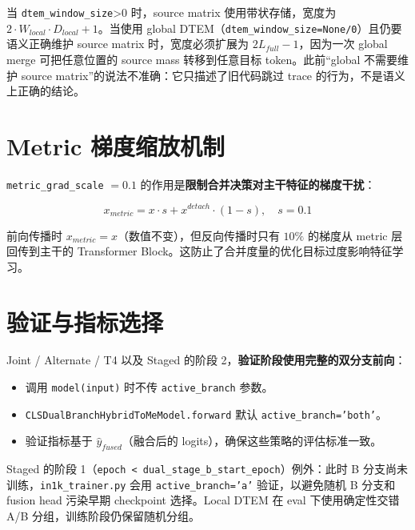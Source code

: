 \documentclass[a4paper,11pt]{article}
\begin{document}
当 \texttt{dtem\_window\_size}>0 时，source matrix 使用带状存储，宽度为 $2\cdot W_{local}\cdot D_{local}+1$。当使用 global DTEM（\texttt{dtem\_window\_size=None/0}）且仍要语义正确维护 source matrix 时，宽度必须扩展为 $2L_{full}-1$，因为一次 global merge 可把任意位置的 source mass 转移到任意目标 token。此前“global 不需要维护 source matrix”的说法不准确：它只描述了旧代码跳过 trace 的行为，不是语义上正确的结论。

\section{Metric 梯度缩放机制}

\texttt{metric\_grad\_scale} $= 0.1$ 的作用是\textbf{限制合并决策对主干特征的梯度干扰}：

\[
    x_{metric} = x \cdot s + x^{detach} \cdot (1 - s), \quad s = 0.1
\]

前向传播时 $x_{metric} = x$（数值不变），但反向传播时只有 $10\%$ 的梯度从 metric 层回传到主干的 Transformer Block。这防止了合并度量的优化目标过度影响特征学习。

\section{验证与指标选择}

Joint / Alternate / T4 以及 Staged 的阶段 2，\textbf{验证阶段使用完整的双分支前向}：
\begin{itemize}
    \item 调用 \texttt{model(input)} 时不传 \texttt{active\_branch} 参数。
    \item \texttt{CLSDualBranchHybridToMeModel.forward} 默认 \texttt{active\_branch='both'}。
    \item 验证指标基于 $\hat{y}_{fused}$（融合后的 logits），确保这些策略的评估标准一致。
\end{itemize}
Staged 的阶段 1（\texttt{epoch < dual\_stage\_b\_start\_epoch}）例外：此时 B 分支尚未训练，\texttt{in1k\_trainer.py} 会用 \texttt{active\_branch='a'} 验证，以避免随机 B 分支和 fusion head 污染早期 checkpoint 选择。Local DTEM 在 eval 下使用确定性交错 A/B 分组，训练阶段仍保留随机分组。

\end{document}
